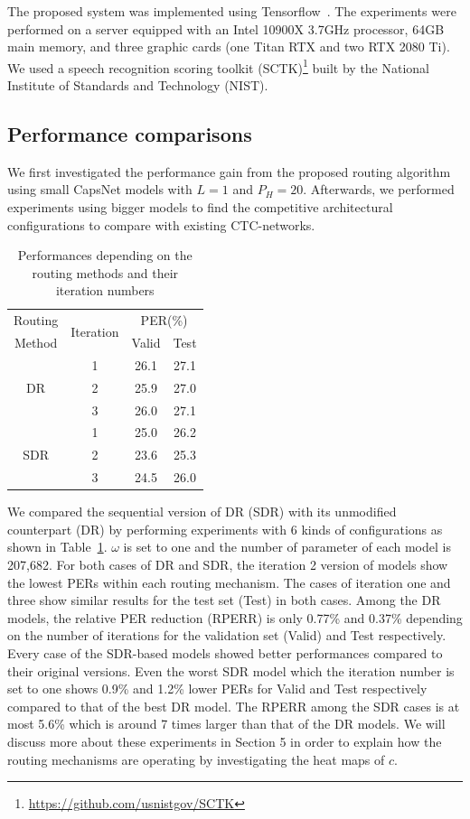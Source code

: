 \documentclass[review]{elsarticle}
\begin{document}
The proposed system was implemented using Tensorflow~\citep{DBLP:journals/corr/AbadiABBCCCDDDG16}.
The experiments were performed on a server equipped with an Intel 10900X 3.7GHz processor, 64GB main memory, and three graphic cards (one Titan RTX and two RTX 2080 Ti).
We used a speech recognition scoring toolkit (SCTK)\footnote{\url{https://github.com/usnistgov/SCTK}} built by 
the National Institute of Standards and Technology (NIST).

\subsection{Performance comparisons}
We first investigated the performance gain from the proposed routing algorithm using small CapsNet models with $L=1$ and $P_H=20$.
Afterwards, we performed experiments using bigger models to find the competitive architectural configurations to compare with existing CTC-networks.

\begin{table}[]
\centering
\begin{tabular}{cccc}
Routing & \multirow{2}{*}{Iteration} & \multicolumn{2}{c}{PER(\%)} \\
Method  &                            & Valid & Test                \\ \hline
\multirow{3}{*}{DR}  & 1 & 26.1 & 27.1 \\
                     & 2 & 25.9 & 27.0 \\
                     & 3 & 26.0 & 27.1 \\ \hline
\multirow{3}{*}{SDR} & 1 & 25.0 & 26.2 \\
                     & 2 & 23.6 & 25.3 \\
                     & 3 & 24.5 & 26.0
\end{tabular}
\caption{Performances depending on the routing methods and their iteration numbers}%
\label{Tab:iter}%
\end{table}
We compared the sequential version of DR (SDR) with its unmodified counterpart (DR) by performing experiments with 6 kinds of configurations as shown in Table~\ref{Tab:iter}.
$\omega$ is set to one and the number of parameter of each model is 207,682.
For both cases of DR and SDR, the iteration 2 version of models show the lowest PERs within each routing mechanism.
The cases of iteration one and three show similar results for the test set (Test) in both cases.
Among the DR models, the relative PER reduction (RPERR) is only 0.77\% and 0.37\% depending on the number of iterations for the validation set (Valid) and Test respectively.
Every case of the SDR-based models showed better performances compared to their original versions.
Even the worst SDR model which the iteration number is set to one shows 0.9\% and 1.2\% lower PERs for Valid and Test respectively compared to that of the best DR model.
The RPERR among the SDR cases is at most 5.6\% which is around 7 times larger than that of the DR models.
We will discuss more about these experiments in Section 5 in order to explain how the routing mechanisms are operating by investigating the heat maps of $c$.
\end{document}
